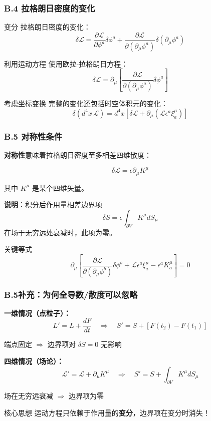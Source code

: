 \documentclass[xcolor=dvipsnames]{ctexbeamer}
\begin{document}
\begin{frame}
\frametitle{B.4 拉格朗日密度的变化}
\begin{block}{变分}
拉格朗日密度的变化：
$$\delta\mathcal{L} = \frac{\partial\mathcal{L}}{\partial\phi^a}\delta\phi^a + \frac{\partial\mathcal{L}}{\partial(\partial_\mu\phi^a)}\delta(\partial_\mu\phi^a)$$
\end{block}

\pause

\begin{block}{利用运动方程}
使用欧拉-拉格朗日方程：
$$\delta\mathcal{L} = \partial_\mu\left[\frac{\partial\mathcal{L}}{\partial(\partial_\mu\phi^a)}\delta\phi^a\right]$$
\end{block}

\pause

\begin{block}{考虑坐标变换}
完整的变化还包括时空体积元的变化：
$$\delta(d^4x \, \mathcal{L}) = d^4x \left[\delta\mathcal{L} + \partial_\mu(\mathcal{L}\epsilon^a\xi^\mu_a)\right]$$
\end{block}
\end{frame}

\begin{frame}
\frametitle{B.5 对称性条件}
\textbf{对称性}意味着拉格朗日密度至多相差四维散度：

$$\boxed{\delta\mathcal{L} = \epsilon\partial_\mu K^\mu}$$

其中 $K^\mu$ 是某个四维矢量。

\vspace{0.5em}

\textbf{说明}：积分后作用量相差边界项
$$\delta S = \epsilon\int_{\partial V} K^\mu dS_\mu$$
在场于无穷远处衰减时，此项为零。

\pause

\begin{alertblock}{关键等式}
$$\partial_\mu\left[\frac{\partial\mathcal{L}}{\partial(\partial_\mu\phi^b)}\delta\phi^b + \mathcal{L}\epsilon^a\xi^\mu_a - \epsilon^a K^\mu_a\right] = 0$$
\end{alertblock}
\end{frame}

\begin{frame}
\frametitle{B.5补充：为何全导数/散度可以忽略}

\textbf{一维情况（点粒子）：}
$$L' = L + \frac{dF}{dt} \quad \Rightarrow \quad S' = S + [F(t_2) - F(t_1)]$$

端点固定 $\Rightarrow$ 边界项对 $\delta S = 0$ 无影响

\vspace{1em}

\textbf{四维情况（场论）：}
$$\mathcal{L}' = \mathcal{L} + \partial_\mu K^\mu \quad \Rightarrow \quad S' = S + \int_{\partial V} K^\mu dS_\mu$$

场在无穷远衰减 $\Rightarrow$ 边界项为零

\vspace{1em}

\begin{alertblock}{核心思想}
运动方程只依赖于作用量的\textbf{变分}，边界项在变分时消失！
\end{alertblock}
\end{frame}
\end{document}
